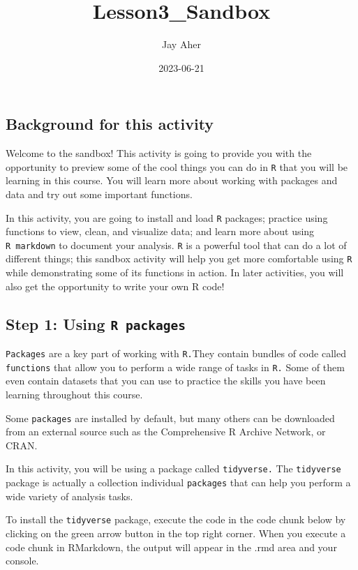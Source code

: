 \documentclass[
]{article}
\title{Lesson3\_Sandbox}
\author{Jay Aher}
\date{2023-06-21}
\begin{document}
\maketitle

\hypertarget{background-for-this-activity}{%
\subsection{Background for this
activity}\label{background-for-this-activity}}

Welcome to the sandbox! This activity is going to provide you with the
opportunity to preview some of the cool things you can do in \texttt{R}
that you will be learning in this course. You will learn more about
working with packages and data and try out some important functions.

In this activity, you are going to install and load \texttt{R} packages;
practice using functions to view, clean, and visualize data; and learn
more about using \texttt{R\ markdown} to document your analysis.
\texttt{R} is a powerful tool that can do a lot of different things;
this sandbox activity will help you get more comfortable using
\texttt{R} while demonstrating some of its functions in action. In later
activities, you will also get the opportunity to write your own R code!

\hypertarget{step-1-using-r-packages}{%
\subsection{\texorpdfstring{Step 1: Using
\texttt{R\ packages}}{Step 1: Using R packages}}\label{step-1-using-r-packages}}

\texttt{Packages} are a key part of working with \texttt{R.}They contain
bundles of code called \texttt{functions} that allow you to perform a
wide range of tasks in \texttt{R.} Some of them even contain datasets
that you can use to practice the skills you have been learning
throughout this course.

Some \texttt{packages} are installed by default, but many others can be
downloaded from an external source such as the Comprehensive R Archive
Network, or CRAN.

In this activity, you will be using a package called \texttt{tidyverse.}
The \texttt{tidyverse} package is actually a collection individual
\texttt{packages} that can help you perform a wide variety of analysis
tasks.

To install the \texttt{tidyverse} package, execute the code in the code
chunk below by clicking on the green arrow button in the top right
corner. When you execute a code chunk in RMarkdown, the output will
appear in the .rmd area and your console.
\end{document}
